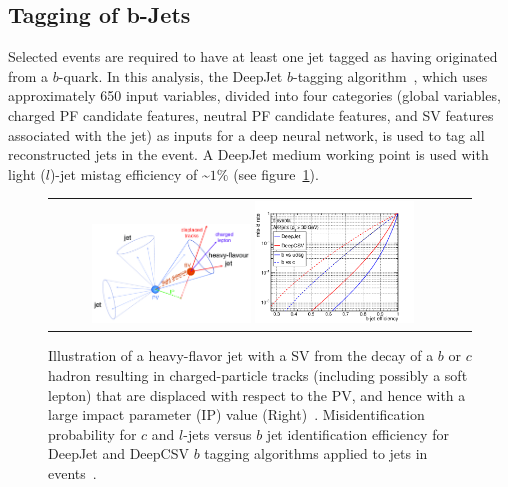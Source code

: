 \subsection{Tagging of b-Jets}
Selected events are required to have at least one jet tagged as having originated from a $b$-quark.
In this analysis, the DeepJet $b$-tagging algorithm~\cite{bib:Bols_2020}, which uses approximately 650 input variables, divided into four categories (global variables, charged PF candidate features, neutral PF candidate features, and SV features associated with the jet) as inputs for a deep neural network, is used to tag all reconstructed jets in the event.
A DeepJet medium working point is used with light ($l$)-jet mistag efficiency of \sim$1\%$ (see figure~\ref{bTagging}).
\begin{figure}[htb]
  \begin{center}
    \begin{tabular}{cc}
        \includegraphics[width=0.40\textwidth]{fig_Event_Selection/Secondary_Vertex.png}
        \includegraphics[width=0.40\textwidth]{fig_Event_Selection/DeepJet.png}
    \end{tabular}
    \caption{Illustration of a heavy-flavor jet with a SV from the decay of a $b$ or $c$ hadron resulting in charged-particle tracks (including possibly a soft lepton) that are displaced with respect to the PV, and hence with a large impact parameter (IP) value (Right)~\cite{app122010574}.
    Misidentification probability for $c$ and $l$-jets versus $b$ jet identification efficiency for DeepJet and DeepCSV $b$ tagging algorithms applied to jets in \ttbar events~\cite{app122010574}.
            }
    \label{bTagging}
  \end{center}
\end{figure}

